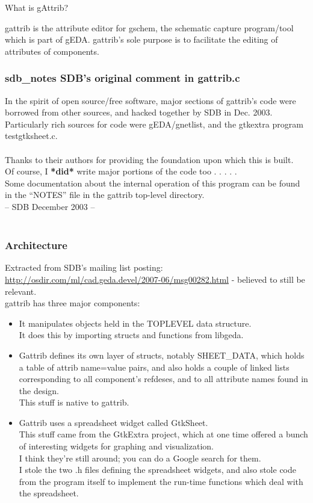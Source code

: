  What is gAttrib? 

  gattrib is the attribute editor for gschem, the schematic capture program/tool which is part of gEDA. gattrib's sole purpose is to facilitate the editing of attributes of components. 

\subsubsection*{sdb\_notes SDB's original comment in gattrib.c}
 In the spirit of open source/free software, major sections of gattrib's code were borrowed from other sources, and hacked together by SDB in Dec. 2003.\\ 
 Particularly rich sources for code were gEDA/gnetlist, and the gtkextra program testgtksheet.c.\\ 
\\ 
 Thanks to their authors for providing the foundation upon which this is built.\\ 
 Of course, I \textbf{*did*}
 write major portions of the code too . . . . .\\ 
 Some documentation about the internal operation of this program can be found in the ``NOTES'' file in the gattrib top-level directory.\\ 
 -- SDB December 2003 --\\ 
\\ 
\subsubsection*{Architecture}
 Extracted from SDB's mailing list posting:  \url{http://osdir.com/ml/cad.geda.devel/2007-06/msg00282.html} - believed to still be relevant.\\ 

  gattrib has three major components:\\ 
\begin{itemize}
\item It manipulates objects held in the TOPLEVEL data structure.\\ 
 It does this by importing structs and functions from libgeda. 
\item Gattrib defines its own layer of structs, notably SHEET\_DATA, which holds a table of attrib name=value pairs, and also holds a couple of linked lists corresponding to all component's refdeses, and to all attribute names found in the design.\\ 
 This stuff is native to gattrib. 
\item Gattrib uses a spreadsheet widget called GtkSheet.\\ 
 This stuff came from the GtkExtra project, which at one time offered a bunch of interesting widgets for graphing and visualization.\\ 
 I think they're still around; you can do a Google search for them.\\ 
 I stole the two .h files defining the spreadsheet widgets, and also stole code from the program itself to implement the run-time functions which deal with the spreadsheet. 

\end{itemize}

